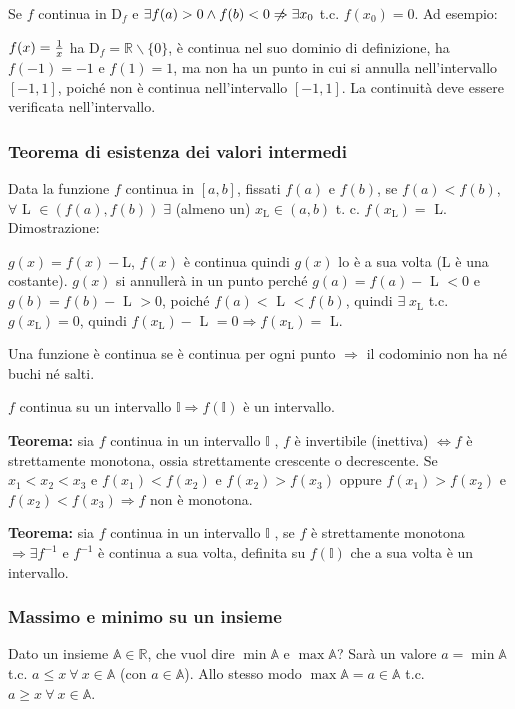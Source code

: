 \documentclass[12pt,a4paper]{article}
\begin{document}
Se $f$ continua in D$_f$ e $\exists f(a) > 0 \land f(b) < 0 
\centernot\Rightarrow \exists x_0 $ t.c. $ f(x_0) = 0 $. Ad esempio:

$f(x) = {1 \over x}$ ha D$_f = \mathbb{R} \backslash \{0\}$, \`e continua
nel suo dominio di definizione, ha $f(-1) = -1$ e $f(1) = 1$, ma non ha 
un punto in cui si annulla nell'intervallo $[-1,1]$, poich\'e non \`e 
continua nell'intervallo $[-1,1]$. La continuit\`a deve essere 
verificata nell'intervallo.

\subsubsection{Teorema di esistenza dei valori intermedi}
Data la funzione $f$ continua in $[a,b]$, fissati $f(a)$ e $f(b)$, 
se $f(a) < f(b)$, $\forall$ L $\in \left(f(a),f(b)\right) \; 
\exists $ (almeno un) $ x_\text{L} \in (a,b)$ t. c. $f(x_\text{L}) 
= $ L. Dimostrazione:

$g(x) = f(x) - $L, $f(x)$ \`e continua quindi $g(x)$ lo \`e a sua volta
(L \`e una costante). $g(x)$ si annuller\`a in un punto perch\'e 
$g(a) = f(a) - $ L $ < 0 $ e $g(b) = f(b) - $ L $ > 0$, poich\'e
$f(a) < $ L $ < f(b) $, quindi $\exists \; x_{\text{L}} $ t.c. 
$g(x_{\text{L}}) = 0$, quindi $f(x_{\text{L}}) - $ L $= 0 \Rightarrow 
f(x_{\text{L}}) = $ L.

Una funzione \`e continua se \`e continua per ogni punto $\Rightarrow$ il
codominio non ha n\'e buchi n\'e salti.

$f$ continua su un intervallo $\mathbb{I} \Rightarrow f(\mathbb{I})$ \`e un
intervallo.

\textbf{Teorema:} sia $f$ continua in un intervallo
$\mathbb{I} $ , $ f$ \`e invertibile (inettiva)
$\Leftrightarrow f$ \`e strettamente monotona, ossia
strettamente crescente o decrescente. 
Se $ x_1 < x_2 < x_3 $ e $ f(x_1) < f(x_2) $ e 
$ f(x_2) > f(x_3) $ oppure $ f(x_1) > f(x_2) $ e
$ f(x_2) < f(x_3) \Rightarrow f$ non \`e monotona.

\textbf{Teorema:} sia $f$ continua in un intervallo
$\mathbb{I}$ , se $f$ \`e strettamente monotona 
$ \Rightarrow \exists f^{-1} $ e $ f^{-1} $ \`e continua a
sua volta, definita su $ f(\mathbb{I}) $ che a sua volta
\`e un intervallo.

\subsubsection{Massimo e minimo su un insieme} 
Dato un insieme $ \mathbb{A} \in \mathbb{R} $, che vuol
dire $ \min \mathbb{A} $ e $ \max \mathbb{A} $? Sar\`a
un valore $ a = \min \mathbb{A} $ t.c. $ a \leq x \ \forall \ x 
\in \mathbb{A} $ (con $ a \in \mathbb{A}$). Allo stesso
modo $ \max \mathbb{A} = a \in \mathbb{A} $ t.c.
$ a \geq x \ \forall \ x \in \mathbb{A} $.
\end{document}
